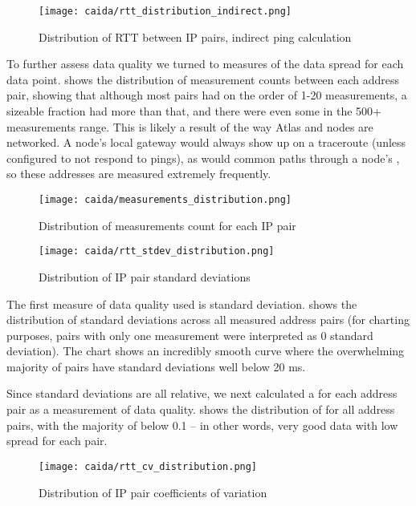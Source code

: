 \begin{wrapfigure}[18]{L}{0.55\textwidth}
    \centering
    \texttt{[image: caida/rtt\_distribution\_indirect.png]}
    \caption{Distribution of RTT between IP pairs, indirect ping calculation}
    \label{fig:caida_rtt_distribution_indirect}
\end{wrapfigure}

To further assess data quality we turned to measures of the data spread for each data point.  shows the distribution of measurement counts between each \ip address pair, showing that although most pairs had on the order of 1-20 measurements, a sizeable fraction had more than that, and there were even some in the 500+ measurements range. This is likely a result of the way \ripe Atlas and \caida nodes are networked. A node's local gateway would always show up on a traceroute (unless configured to not respond to pings), as would common paths through a node's \isp, so these \ip addresses are measured extremely frequently.

\begin{figure}[h]
    \centering
    \texttt{[image: caida/measurements\_distribution.png]}
    \caption{Distribution of measurements count for each IP pair}
    \label{fig:caida_measurements_distribution}
\end{figure}

\begin{figure}[h]
    \centering
    \texttt{[image: caida/rtt\_stdev\_distribution.png]}
    \caption{Distribution of IP pair standard deviations}
    \label{fig:caida_stdev_distribution}
\end{figure}

The first measure of data quality used is standard deviation.  shows the distribution of standard deviations across all measured \ip address pairs (for charting purposes, pairs with only one measurement were interpreted as 0 standard deviation). The chart shows an incredibly smooth curve where the overwhelming majority of pairs have standard deviations well below 20 ms.

Since standard deviations are all relative, we next calculated a \cv for each \ip address pair as a measurement of data quality.  shows the distribution of \cvs for all \ip address pairs, with the majority of \cvs below 0.1 -- in other words, very good data with low spread for each pair.

\begin{figure}[h]
    \centering
    \texttt{[image: caida/rtt\_cv\_distribution.png]}
    \caption{Distribution of IP pair coefficients of variation}
    \label{fig:caida_cv_distribution}
\end{figure}

